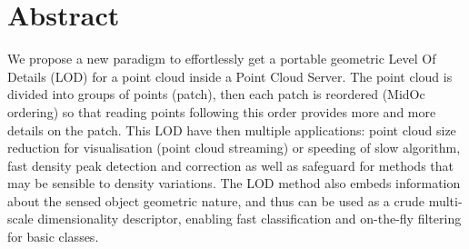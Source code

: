  
\section{Abstract}
	We propose a new paradigm to effortlessly get a portable geometric Level Of Details (LOD) for a point cloud inside a Point Cloud Server. The point cloud is divided into groups of points (patch), then each patch is reordered (MidOc ordering) so that reading points following this order provides more and more details on the patch.
	This LOD have then multiple applications: point cloud size reduction for 
	visualisation (point cloud streaming) or speeding of slow algorithm,
	 fast density peak detection and correction as well as safeguard for methods that may be sensible to density variations.
	The LOD method also embeds information about the sensed object geometric nature, 
	and thus can be used as a crude multi-scale dimensionality descriptor, 
	enabling fast classification and on-the-fly filtering for basic classes. 
	 
	